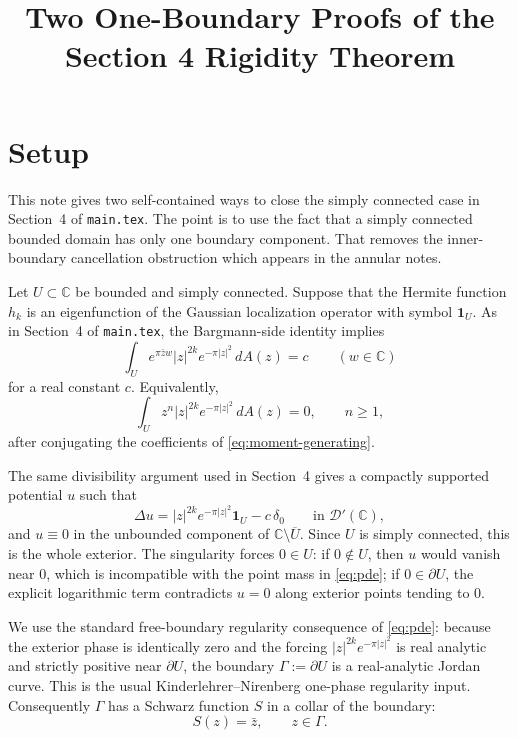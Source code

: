 \documentclass[11pt]{article}
\title{Two One-Boundary Proofs of the Section 4 Rigidity Theorem}
\author{}
\date{}
\newcommand{\C}{\mathbb C}
\newcommand{\1}{\mathbf 1}
\newcommand{\dd}{\,d}
\begin{document}
\maketitle

\section{Setup}

This note gives two self-contained ways to close the simply connected case in
Section~4 of \texttt{main.tex}.  The point is to use the fact that a simply
connected bounded domain has only one boundary component.  That removes the
inner-boundary cancellation obstruction which appears in the annular notes.

Let \(U\subset\C\) be bounded and simply connected.  Suppose that the Hermite
function \(h_k\) is an eigenfunction of the Gaussian localization operator with
symbol \(\1_U\).  As in Section~4 of \texttt{main.tex}, the Bargmann-side
identity implies
\begin{equation}\label{eq:moment-generating}
  \int_U e^{\pi\bar z w}|z|^{2k}e^{-\pi |z|^2}\dd A(z)=c
  \qquad(w\in\C)
\end{equation}
for a real constant \(c\).  Equivalently,
\begin{equation}\label{eq:bulk-moments}
  \int_U z^n |z|^{2k}e^{-\pi |z|^2}\dd A(z)=0,
  \qquad n\ge1,
\end{equation}
after conjugating the coefficients of \eqref{eq:moment-generating}.

The same divisibility argument used in Section~4 gives a compactly supported
potential \(u\) such that
\begin{equation}\label{eq:pde}
  \Delta u=|z|^{2k}e^{-\pi |z|^2}\1_U-c\,\delta_0
  \qquad\text{in }\mathcal D'(\C),
\end{equation}
and \(u\equiv0\) in the unbounded component of \(\C\setminus\overline U\).
Since \(U\) is simply connected, this is the whole exterior.  The singularity
forces \(0\in U\): if \(0\notin U\), then \(u\) would vanish near \(0\), which is
incompatible with the point mass in \eqref{eq:pde}; if \(0\in\partial U\), the
explicit logarithmic term contradicts \(u=0\) along exterior points tending to
\(0\).

We use the standard free-boundary regularity consequence of
\eqref{eq:pde}: because the exterior phase is identically zero and the forcing
\(|z|^{2k}e^{-\pi |z|^2}\) is real analytic and strictly positive near
\(\partial U\), the boundary \(\Gamma:=\partial U\) is a real-analytic Jordan
curve.  This is the usual Kinderlehrer--Nirenberg one-phase regularity input.
Consequently \(\Gamma\) has a Schwarz function \(S\) in a collar of the boundary:
\[
  S(z)=\bar z,\qquad z\in\Gamma .
\]
\end{document}
